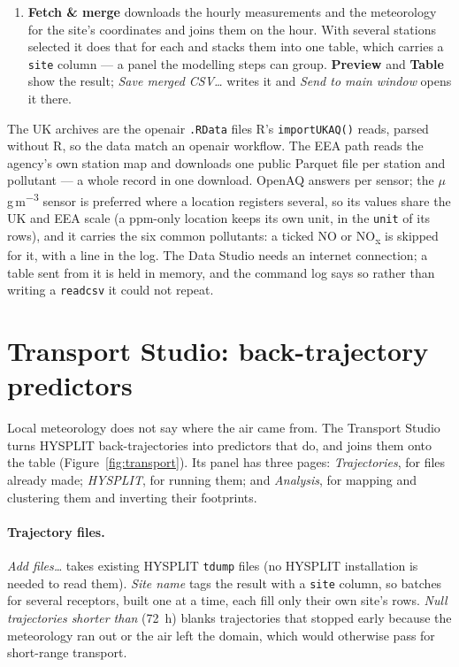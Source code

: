 \documentclass[11pt]{report}
\newcommand{\codeunderscore}{\textunderscore\allowbreak}
\newcommand{\code}[1]{\texttt{\let\_\codeunderscore #1}}
\newcommand{\tab}[1]{\textbf{#1}}
\newcommand{\ugm}{\ensuremath{\mu}g\,m\textsuperscript{$-3$}}
\begin{document}
\begin{enumerate}
        \code{d2m}, \code{rh2m}, \code{sp}, \code{tcc}, \code{tp}, \code{ssrd},
        \code{ws}, \code{wd}, \code{u10} and \code{v10} --- names the \emph{Columns} box
        recognises as meteorology. They come on UTC and are put on the window's clock
        (Section~\ref{sec:clock}) as they are joined.
  \item \textbf{Fetch \& merge} downloads the hourly measurements and the meteorology for
        the site's coordinates and joins them on the hour. With several stations
        selected it does that for each and stacks them into one table, which
        carries a \code{site} column --- a panel the modelling steps can group.
        \tab{Preview} and
        \tab{Table} show the result; \emph{Save merged CSV\ldots} writes it and
        \emph{Send to main window} opens it there.
\end{enumerate}
The UK archives are the openair \code{.RData} files R's \code{importUKAQ()} reads, parsed
without R, so the data match an openair workflow. The EEA path reads the agency's own
station map and downloads one public Parquet file per station and pollutant --- a whole
record in one download. OpenAQ answers per sensor; the \ugm{} sensor is preferred where a
location registers several, so its values share the UK and EEA scale (a ppm-only location
keeps its own unit, in the \code{unit} of its rows), and it carries the six common
pollutants: a ticked NO or NO\textsubscript{x} is skipped for it, with a line in the log.
The Data Studio needs an internet connection; a table sent from it is held in memory, and
the command log says so rather than writing a \code{read\_csv} it could not repeat.


\section{Transport Studio: back-trajectory predictors}\label{sec:transport}
Local meteorology does not say where the air came from. The Transport Studio turns
HYSPLIT back-trajectories into predictors that do, and joins them onto the table
(Figure~\ref{fig:transport}). Its panel has three pages: \emph{Trajectories}, for files
already made; \emph{HYSPLIT}, for running them; and \emph{Analysis}, for mapping and
clustering them and inverting their footprints.

\paragraph{Trajectory files.} \emph{Add files\ldots} takes existing HYSPLIT
\code{tdump} files (no HYSPLIT installation is needed to read them). \emph{Site name}
tags the result with a \code{site} column, so batches for several receptors, built one
at a time, each fill only their own site's rows. \emph{Null trajectories shorter than}
(72~h) blanks trajectories that stopped early because the meteorology ran out or the air
left the domain, which would otherwise pass for short-range transport.
\end{document}
